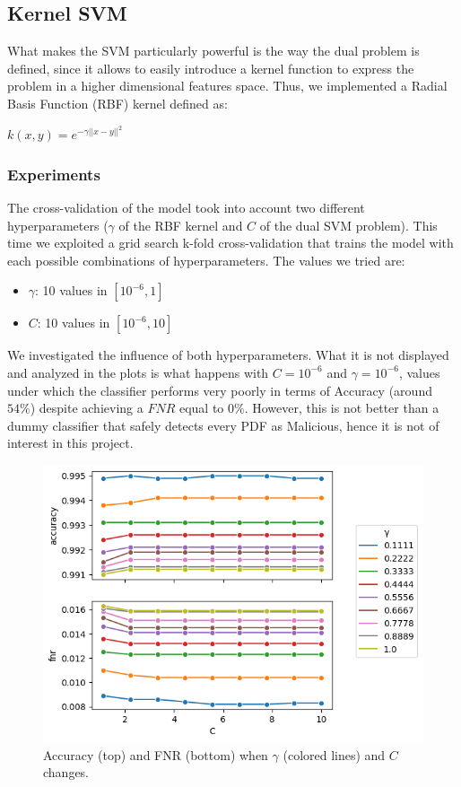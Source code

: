 \documentclass[twocolumn, switch]{article} %
\newcommand\x{0.7}
\begin{document}
\subsection{Kernel SVM}
What makes the SVM particularly powerful is the way the dual problem is defined, since it allows to easily introduce a kernel function to express the problem in a higher dimensional features space. Thus, we implemented a Radial Basis Function (RBF) kernel defined as:
\begin{center}
	$k(x,y) = e^{-\gamma||x-y||^2}$
\end{center}

\subsubsection{Experiments}
\label{sub:expsvm}
The cross-validation of the model took into account two different hyperparameters ($\gamma$ of the RBF kernel and $C$ of the dual SVM problem).
This time we exploited a grid search k-fold cross-validation that trains the model with each possible combinations of hyperparameters. The values we tried are:
\begin{itemize}
	\item $\gamma$: 10 values in $[10^{-6}, 1]$
	\item $C$: 10 values in $[10^{-6}, 10]$
\end{itemize}
We investigated the influence of both hyperparameters. What it is not displayed and analyzed in the plots is what happens with $C=10^{-6}$ and $\gamma=10^{-6}$, values under which the classifier performs very poorly in terms of Accuracy (around $54\%$) despite achieving a $FNR$ equal to $0\%$. However, this is not better than a dummy classifier that safely detects every PDF as Malicious, hence it is not of interest in this project.

\begin{figure}[ht!]
	\centering
	\includegraphics[width=\x\linewidth]{rbf_svm_gamma_accuracy_fnr.png}
	\caption{Accuracy (top) and FNR (bottom) when $\gamma$ (colored lines) and $C$ changes.}
	\label{fig:rbfsvmgamma}
\end{figure}
\end{document}
